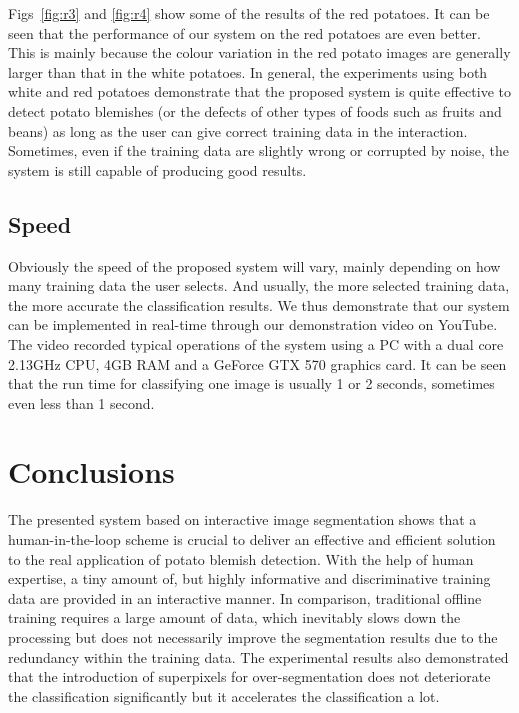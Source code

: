 \documentclass[twocolumn]{svjour3}          %
\begin{document}
Figs~\ref{fig:r3} and \ref{fig:r4} show some of the results of the red potatoes. It can be seen that the performance of our system on the red potatoes are even better. This is mainly because the colour variation in the red potato images are generally larger than that in the white potatoes. In general, the experiments using both white and red potatoes demonstrate that the proposed system is quite effective to detect potato blemishes (or the defects of other types of foods such as fruits and beans) as long as the user can give correct training data in the interaction. Sometimes, even if the training data are slightly wrong or corrupted by noise, the system is still capable of producing good results.

\subsection{Speed}
Obviously the speed of the proposed system will vary, mainly depending on how many training data the user selects. And usually, the more selected training data, the more accurate the classification results. We thus demonstrate that our system can be implemented in real-time through our demonstration video on YouTube. The video recorded typical operations of the system using a PC with a dual core 2.13GHz CPU, 4GB RAM and a GeForce GTX 570 graphics card. It can be seen that the run time for classifying one image is usually 1 or 2 seconds, sometimes even less than 1 second.

\section{Conclusions}
The presented system based on interactive image segmentation shows that a human-in-the-loop scheme is crucial to deliver an effective and efficient solution to the real application of potato blemish detection. With the help of human expertise, a tiny amount of, but highly informative and discriminative training data are provided in an interactive manner. In comparison, traditional offline training requires a large amount of data, which inevitably slows down the processing but does not necessarily improve the segmentation results due to the redundancy within the training data. The experimental results also demonstrated that the introduction of superpixels for over-segmentation does not deteriorate the classification significantly but it accelerates the classification a lot.
\end{document}
